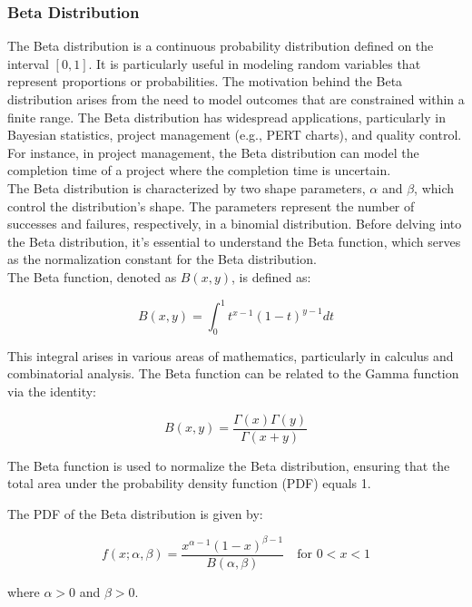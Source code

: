 \subsubsection{Beta Distribution}

The Beta distribution is a continuous probability distribution defined on the interval \([0, 1]\). It is particularly useful in modeling random variables that represent proportions or probabilities. The motivation behind the Beta distribution arises from the need to model outcomes that are constrained within a finite range. The Beta distribution has widespread applications, particularly in Bayesian statistics, project management (e.g., PERT charts), and quality control. For instance, in project management, the Beta distribution can model the completion time of a project where the completion time is uncertain. \\

The Beta distribution is characterized by two shape parameters, \(\alpha\) and \(\beta\), which control the distribution's shape. The parameters represent the number of successes and failures, respectively, in a binomial distribution. Before delving into the Beta distribution, it's essential to understand the Beta function, which serves as the normalization constant for the Beta distribution. \\

The Beta function, denoted as \(B(x, y)\), is defined as:

\[
B(x, y) = \int_0^1 t^{x-1} (1 - t)^{y-1} dt
\]

This integral arises in various areas of mathematics, particularly in calculus and combinatorial analysis. The Beta function can be related to the Gamma function via the identity:

\[
B(x, y) = \frac{\Gamma(x) \Gamma(y)}{\Gamma(x + y)}
\]

The Beta function is used to normalize the Beta distribution, ensuring that the total area under the probability density function (PDF) equals 1.

\begin{definition}
    The PDF of the Beta distribution is given by:

\[
f(x; \alpha, \beta) = \frac{x^{\alpha - 1} (1 - x)^{\beta - 1}}{B(\alpha, \beta)} \quad \text{for } 0 < x < 1
\]

where \(\alpha > 0\) and \(\beta > 0\).
\end{definition}

